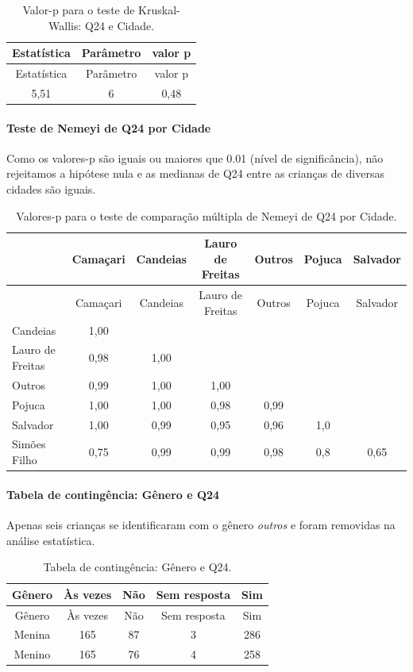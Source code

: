 \documentclass[]{article}
\let\oldparagraph\paragraph
\renewcommand{\paragraph}[1]{\oldparagraph{#1}\mbox{}}
\begin{document}
\begin{longtable}[]{@{}ccc@{}}
\caption{\label{tab:unnamed-chunk-609}Valor-p para o teste de Kruskal-Wallis: Q24 e Cidade.}\tabularnewline
\toprule
Estatística & Parâmetro & valor p\tabularnewline
\midrule
\endfirsthead
\toprule
Estatística & Parâmetro & valor p\tabularnewline
\midrule
\endhead
5,51 & 6 & 0,48\tabularnewline
\bottomrule
\end{longtable}

\hypertarget{teste-de-nemeyi-de-q24-por-cidade}{%
\paragraph{Teste de Nemeyi de Q24 por Cidade}\label{teste-de-nemeyi-de-q24-por-cidade}}

Como os valores-p são iguais ou maiores que 0.01 (nível de significância), não rejeitamos a hipótese nula e as medianas de Q24 entre as crianças de diversas cidades são iguais.

\begin{longtable}[]{@{}lcccccc@{}}
\caption{\label{tab:unnamed-chunk-611}Valores-p para o teste de comparação múltipla de Nemeyi de Q24 por Cidade.}\tabularnewline
\toprule
& Camaçari & Candeias & Lauro de Freitas & Outros & Pojuca & Salvador\tabularnewline
\midrule
\endfirsthead
\toprule
& Camaçari & Candeias & Lauro de Freitas & Outros & Pojuca & Salvador\tabularnewline
\midrule
\endhead
Candeias & 1,00 & & & & &\tabularnewline
Lauro de Freitas & 0,98 & 1,00 & & & &\tabularnewline
Outros & 0,99 & 1,00 & 1,00 & & &\tabularnewline
Pojuca & 1,00 & 1,00 & 0,98 & 0,99 & &\tabularnewline
Salvador & 1,00 & 0,99 & 0,95 & 0,96 & 1,0 &\tabularnewline
Simões Filho & 0,75 & 0,99 & 0,99 & 0,98 & 0,8 & 0,65\tabularnewline
\bottomrule
\end{longtable}

\cleardoublepage

\hypertarget{tabela-de-continguxeancia-guxeanero-e-q24}{%
\paragraph{Tabela de contingência: Gênero e Q24}\label{tabela-de-continguxeancia-guxeanero-e-q24}}

Apenas seis crianças se identificaram com o gênero \emph{outros} e foram removidas na análise estatística.

\begin{longtable}[]{@{}ccccc@{}}
\caption{\label{tab:unnamed-chunk-612}Tabela de contingência: Gênero e Q24.}\tabularnewline
\toprule
Gênero & Às vezes & Não & Sem resposta & Sim\tabularnewline
\midrule
\endfirsthead
\toprule
Gênero & Às vezes & Não & Sem resposta & Sim\tabularnewline
\midrule
\endhead
Menina & 165 & 87 & 3 & 286\tabularnewline
Menino & 165 & 76 & 4 & 258\tabularnewline
\bottomrule
\end{longtable}
\end{document}

